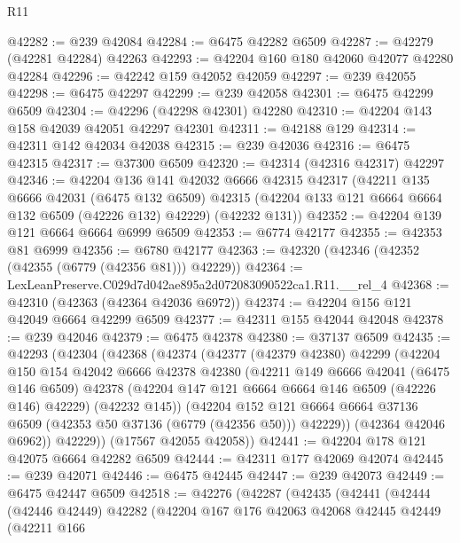 \begin{lexlean}{R11}
\begin{coremodule}
@42282 := @239 @42084
@42284 := @6475 @42282 @6509
@42287 := @42279 (@42281 @42284) @42263
@42293 := @42204 @160 @180 @42060 @42077 @42280 @42284
@42296 := @42242 @159 @42052 @42059
@42297 := @239 @42055
@42298 := @6475 @42297
@42299 := @239 @42058
@42301 := @6475 @42299 @6509
@42304 := @42296 (@42298 @42301) @42280
@42310 := @42204 @143 @158 @42039 @42051 @42297 @42301
@42311 := @42188 @129
@42314 := @42311 @142 @42034 @42038
@42315 := @239 @42036
@42316 := @6475 @42315
@42317 := @37300 @6509
@42320 := @42314 (@42316 @42317) @42297
@42346 := @42204
    @136
    @141
    @42032
    @6666
    @42315
    @42317
    (@42211
      @135
      @6666
      @42031
      (@6475 @132 @6509)
      @42315
      (@42204 @133 @121 @6664 @6664 @132 @6509 (@42226 @132) @42229)
      (@42232 @131))
@42352 := @42204 @139 @121 @6664 @6664 @6999 @6509
@42353 := @6774 @42177
@42355 := @42353 @81 @6999
@42356 := @6780 @42177
@42363 := @42320 (@42346 (@42352 (@42355 (@6779 (@42356 @81))) @42229))
@42364 := LexLeanPreserve.C029d7d042ae895a2d072083090522ca1.R11.__rel_4
@42368 := @42310 (@42363 (@42364 @42036 @6972))
@42374 := @42204 @156 @121 @42049 @6664 @42299 @6509
@42377 := @42311 @155 @42044 @42048
@42378 := @239 @42046
@42379 := @6475 @42378
@42380 := @37137 @6509
@42435 := @42293
    (@42304
      (@42368
        (@42374
          (@42377
            (@42379 @42380)
            @42299
            (@42204
              @150
              @154
              @42042
              @6666
              @42378
              @42380
              (@42211
                @149
                @6666
                @42041
                (@6475 @146 @6509)
                @42378
                (@42204 @147 @121 @6664 @6664 @146 @6509 (@42226 @146) @42229)
                (@42232 @145))
              (@42204
                @152
                @121
                @6664
                @6664
                @37136
                @6509
                (@42353 @50 @37136 (@6779 (@42356 @50)))
                @42229))
            (@42364 @42046 @6962))
          @42229))
      (@17567 @42055 @42058))
@42441 := @42204 @178 @121 @42075 @6664 @42282 @6509
@42444 := @42311 @177 @42069 @42074
@42445 := @239 @42071
@42446 := @6475 @42445
@42447 := @239 @42073
@42449 := @6475 @42447 @6509
@42518 := @42276
    (@42287
      (@42435
        (@42441
          (@42444
            (@42446 @42449)
            @42282
            (@42204
              @167
              @176
              @42063
              @42068
              @42445
              @42449
              (@42211
                @166

\end{coremodule}
\end{lexlean}
